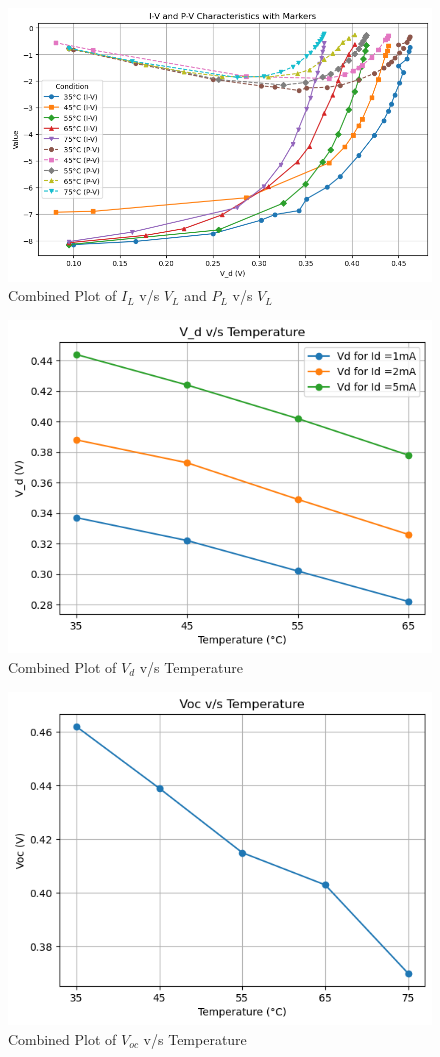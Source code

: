 \documentclass[a4paper]{article}
\begin{document}
\begin{figure}[h!]
    \centering
    \includegraphics[width=1\linewidth]{Lab_5/Post_Lab/I_L_vs_V_d_and_P_L_vs_V_d_Exp_2_Combined.png}
    \caption{Combined Plot of $I_L$ v/s $V_L$ and $P_L$ v/s $V_L$}
\end{figure}
\begin{figure}[h!]
    \centering
    \includegraphics[width=0.7\linewidth]{Lab_5/Post_Lab/V_d_vs_Temperature.png}
    \caption{Combined Plot of $V_d$ v/s Temperature}
\end{figure}
\newpage
\begin{figure}[h!]
    \centering
    \includegraphics[width=0.7\linewidth]{Lab_5/Post_Lab/V_oc_vs_Temperature.png}
    \caption{Combined Plot of $V_{oc}$ v/s Temperature}
\end{figure}
\end{document}
